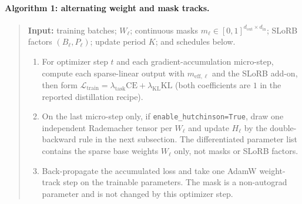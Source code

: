 \documentclass{article}
\begin{document}
\begin{minipage}{\linewidth}
\paragraph{Algorithm 1: alternating weight and mask tracks.}
\begin{quote}\small
\textbf{Input:} training batches; $W_\ell$; continuous masks
$m_\ell\in[0,1]^{d_{\mathrm{out}}\times d_{\mathrm{in}}}$; SLoRB factors
$(B_\ell,P_\ell)$; update period $K$; and schedules below.
\begin{enumerate}
  \item For optimizer step $t$ and each gradient-accumulation micro-step,
  compute each sparse-linear output with $m_{\mathrm{eff},\ell}$ and the SLoRB
  add-on, then form
  $\mathcal{L}_{\mathrm{train}}=\lambda_{\mathrm{task}}\mathrm{CE}
  +\lambda_{\mathrm{KL}}\mathrm{KL}$ (both coefficients are $1$ in the
  reported distillation recipe).
  \item On the last micro-step only, if \texttt{enable\_hutchinson=True}, draw
  one independent Rademacher tensor per $W_\ell$ and update $H_\ell$ by the
  double-backward rule in the next subsection. The differentiated parameter
  list contains the sparse base weights $W_\ell$ only, not masks or SLoRB
  factors.
  \item Back-propagate the accumulated loss and take one AdamW weight-track
  step on the trainable parameters. The mask is a non-autograd parameter and
  is not changed by this optimizer step.
\end{enumerate}
\end{quote}
\end{minipage}
\end{document}
